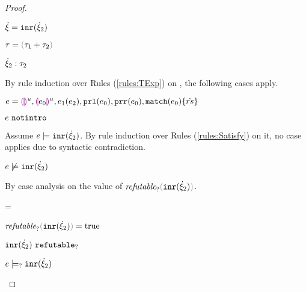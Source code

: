 \begin{proof}
\begin{byCases}
\begin{byCases}
    \end{byCases}
\item[\text{(\ref{rule:CTInr})}]
    \begin{pfsteps*}
    \item $\dot{\xi}=\mathtt{inr}(\dot{\xi}_2)$ 
    \item $\tau=\tsum{\tau_1}{\tau_2}$ 
    \item $\dot{\xi}_2 : \tau_2$  
    \end{pfsteps*}
    By rule induction over Rules (\ref{rules:TExp}) on , the following cases apply.
    \begin{byCases}
    \item[\text{(\ref{rule:TEHole}),(\ref{rule:THole}),(\ref{rule:TAp}),(\ref{rule:TPrl}),(\ref{rule:TPrr}),(\ref{rule:TMatchZPre}),(\ref{rule:TMatchNZPre})}]
        \begin{pfsteps*}
        \item $e=\textcolor{violet}{\llparenthesis}\textcolor{violet}{\rrparenthesis}^{u},\textcolor{violet}{\llparenthesis} e_0\textcolor{violet}{\rrparenthesis}^{u},e_1(e_2),\mathtt{prl}(e_0),\mathtt{prr}(e_0),\mathtt{match}(e_0) \{\hat{rs}\}$ 
        \item $e ~\mathtt{notintro}$  
        \end{pfsteps*}
        Assume $e \models \mathtt{inr}(\dot{\xi}_2)$. By rule induction over Rules (\ref{rules:Satisfy}) on it, no case applies due to syntactic contradiction.
        \begin{pfsteps*}
        \item $e \not\models \mathtt{inr}(\dot{\xi}_2)$  
        \end{pfsteps*}
        By case analysis on the value of $\frefutable{\cinr{\hxi_2}}$. 
        \begin{byCases}
        \item[\frefutable{\cinr{\hxi_2}}=\true]
            \begin{pfsteps*}
            \item $\frefutable{\cinr{\hxi_2}}=\true$  
            \item $\mathtt{inr}(\dot{\xi}_2) ~\mathtt{refutable}_?$  
            \item $e \models_{?} \mathtt{inr}(\dot{\xi}_2)$  

\end{pfsteps*}
\end{byCases}
\end{byCases}
\end{byCases}
\end{proof}
